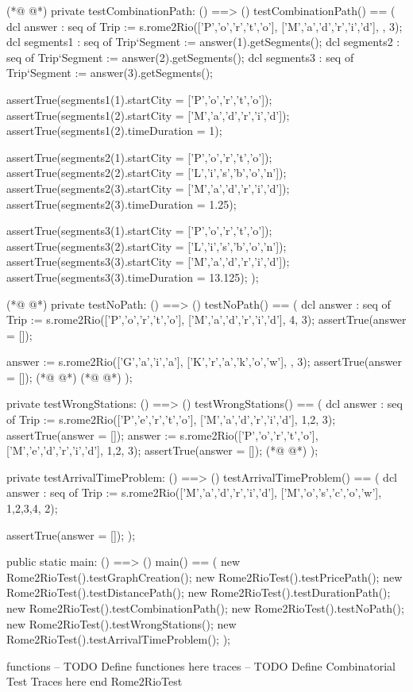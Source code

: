 \begin{vdmpp}[breaklines=true]
(*@
\label{testCombinationPath:59}
@*)
    private testCombinationPath: () ==> ()
    testCombinationPath() == (
      dcl answer : seq of Trip := s.rome2Rio(['P','o','r','t','o'], ['M','a','d','r','i','d'], {}, 3);
      dcl segments1 : seq of Trip`Segment := answer(1).getSegments();
      dcl segments2 : seq of Trip`Segment := answer(2).getSegments();
      dcl segments3 : seq of Trip`Segment := answer(3).getSegments();
      
      assertTrue(segments1(1).startCity = ['P','o','r','t','o']);
      assertTrue(segments1(2).startCity = ['M','a','d','r','i','d']);
      assertTrue(segments1(2).timeDuration = 1);
      
      assertTrue(segments2(1).startCity = ['P','o','r','t','o']);
      assertTrue(segments2(2).startCity = ['L','i','s','b','o','n']);
      assertTrue(segments2(3).startCity = ['M','a','d','r','i','d']);
      assertTrue(segments2(3).timeDuration = 1.25);
      
      assertTrue(segments3(1).startCity = ['P','o','r','t','o']);
      assertTrue(segments3(2).startCity = ['L','i','s','b','o','n']);
      assertTrue(segments3(3).startCity = ['M','a','d','r','i','d']);
      assertTrue(segments3(3).timeDuration = 13.125);
    );
    
(*@
\label{testNoPath:81}
@*)
    private testNoPath: () ==> ()
    testNoPath() == (
      dcl answer : seq of Trip := s.rome2Rio(['P','o','r','t','o'], ['M','a','d','r','i','d'], {4}, 3);
     assertTrue(answer = []);
     
     answer := s.rome2Rio(['G','a','i','a'], ['K','r','a','k','o','w'], {}, 3);
     assertTrue(answer = []);
(*@
\label{main:88}
@*)
(*@
\label{testWrongStations:88}
@*)
    );
    
    private testWrongStations: () ==> ()
    testWrongStations() == (
      dcl answer : seq of Trip := s.rome2Rio(['P','e','r','t','o'], ['M','a','d','r','i','d'], {1,2}, 3);
     assertTrue(answer = []);
     answer := s.rome2Rio(['P','o','r','t','o'], ['M','e','d','r','i','d'], {1,2}, 3);
     assertTrue(answer = []);
(*@
\label{testArrivalTimeProblem:96}
@*)
    );
    
    private testArrivalTimeProblem: () ==> ()
    testArrivalTimeProblem() == (
      dcl answer : seq of Trip := s.rome2Rio(['M','a','d','r','i','d'], ['M','o','s','c','o','w'], {1,2,3,4}, 2);
     
     assertTrue(answer = []);
    );
        
    public static main: () ==> ()
    main() == (
      new Rome2RioTest().testGraphCreation();
      new Rome2RioTest().testPricePath();
      new Rome2RioTest().testDistancePath();
      new Rome2RioTest().testDurationPath();
      new Rome2RioTest().testCombinationPath();
      new Rome2RioTest().testNoPath();
      new Rome2RioTest().testWrongStations();
      new Rome2RioTest().testArrivalTimeProblem();
   );
   
functions
-- TODO Define functiones here
traces
-- TODO Define Combinatorial Test Traces here
end Rome2RioTest
\end{vdmpp}
